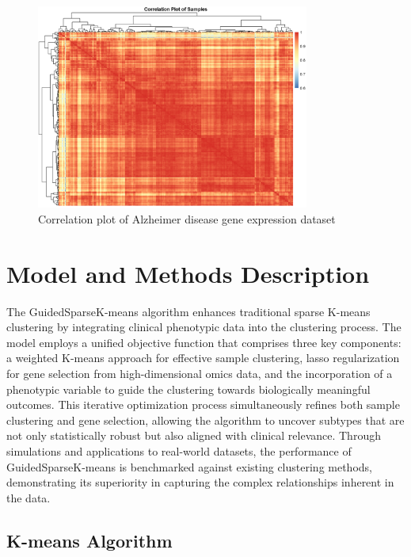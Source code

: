 \documentclass{statsoc}
\begin{document}
\begin{figure}[h!]
    \centering
    \includegraphics[width=0.8\textwidth]{alzheimer_corr.png}
    \caption{Correlation plot of Alzheimer disease gene expression dataset}
    \label{fig:alzheimer_corr}
\end{figure}

\section{Model and Methods Description}

The GuidedSparseK-means algorithm enhances traditional sparse K-means clustering by integrating clinical phenotypic data into the clustering process. The model employs a unified objective function that comprises three key components: a weighted K-means approach for effective sample clustering, lasso regularization for gene selection from high-dimensional omics data, and the incorporation of a phenotypic variable to guide the clustering towards biologically meaningful outcomes. This iterative optimization process simultaneously refines both sample clustering and gene selection, allowing the algorithm to uncover subtypes that are not only statistically robust but also aligned with clinical relevance. Through simulations and applications to real-world datasets, the performance of GuidedSparseK-means is benchmarked against existing clustering methods, demonstrating its superiority in capturing the complex relationships inherent in the data.

\subsection{K-means Algorithm}
\end{document}
